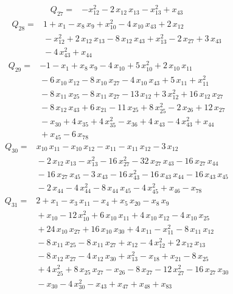 \documentclass[11pt]{article}
\theoremstyle{definition}\newtheorem{definition}[theorem]{Definition}
\begin{document}
\begin{align*}
Q_{27}={}&-x_{12}^{2}-2\,x_{12}\,x_{13}-x_{13}^{2}+x_{43}
\end{align*}
\begin{align*}
Q_{28}={}&1+x_{1}-x_{8}\,x_{9}+x_{10}^{2}-4\,x_{10}\,x_{43}+2\,x_{12}
\\ &{}-x_{12}^{2}+2\,x_{12}\,x_{13}-8\,x_{12}\,x_{43}+x_{13}^{2}-2\,x_{27}+3\,x_{43}
\\ &{}-4\,x_{43}^{2}+x_{44}
\end{align*}
\begin{align*}
Q_{29}={}&-1-x_{1}+x_{8}\,x_{9}-4\,x_{10}+5\,x_{10}^{2}+2\,x_{10}\,x_{11}
\\ &{}-6\,x_{10}\,x_{12}-8\,x_{10}\,x_{27}-4\,x_{10}\,x_{43}+5\,x_{11}+x_{11}^{2}
\\ &{}-8\,x_{11}\,x_{25}-8\,x_{11}\,x_{27}-13\,x_{12}+3\,x_{12}^{2}+16\,x_{12}\,x_{27}
\\ &{}-8\,x_{12}\,x_{43}+6\,x_{21}-11\,x_{25}+8\,x_{25}^{2}-2\,x_{26}+12\,x_{27}
\\ &{}-x_{30}+4\,x_{35}+4\,x_{35}^{2}-x_{36}+4\,x_{43}-4\,x_{43}^{2}+x_{44}
\\ &{}+x_{45}-6\,x_{78}
\end{align*}
\begin{align*}
Q_{30}={}&x_{10}\,x_{11}-x_{10}\,x_{12}-x_{11}-x_{11}\,x_{12}-3\,x_{12}
\\ &{}-2\,x_{12}\,x_{13}-x_{13}^{2}-16\,x_{27}^{2}-32\,x_{27}\,x_{43}-16\,x_{27}\,x_{44}
\\ &{}-16\,x_{27}\,x_{45}-3\,x_{43}-16\,x_{43}^{2}-16\,x_{43}\,x_{44}-16\,x_{43}\,x_{45}
\\ &{}-2\,x_{44}-4\,x_{44}^{2}-8\,x_{44}\,x_{45}-4\,x_{45}^{2}+x_{46}-x_{78}
\end{align*}
\begin{align*}
Q_{31}={}&2+x_{1}-x_{3}\,x_{11}-x_{4}+x_{5}\,x_{20}-x_{8}\,x_{9}
\\ &{}+x_{10}-12\,x_{10}^{2}+6\,x_{10}\,x_{11}+4\,x_{10}\,x_{12}-4\,x_{10}\,x_{25}
\\ &{}+24\,x_{10}\,x_{27}+16\,x_{10}\,x_{30}+4\,x_{11}-x_{11}^{2}-8\,x_{11}\,x_{12}
\\ &{}-8\,x_{11}\,x_{25}-8\,x_{11}\,x_{27}+x_{12}-4\,x_{12}^{2}+2\,x_{12}\,x_{13}
\\ &{}-8\,x_{12}\,x_{27}-4\,x_{12}\,x_{30}+x_{13}^{2}-x_{18}+x_{21}-8\,x_{25}
\\ &{}+4\,x_{25}^{2}+8\,x_{25}\,x_{27}-x_{26}-8\,x_{27}-12\,x_{27}^{2}-16\,x_{27}\,x_{30}
\\ &{}-x_{30}-4\,x_{30}^{2}-x_{43}+x_{47}+x_{48}+x_{83}
\end{align*}
\end{document}
